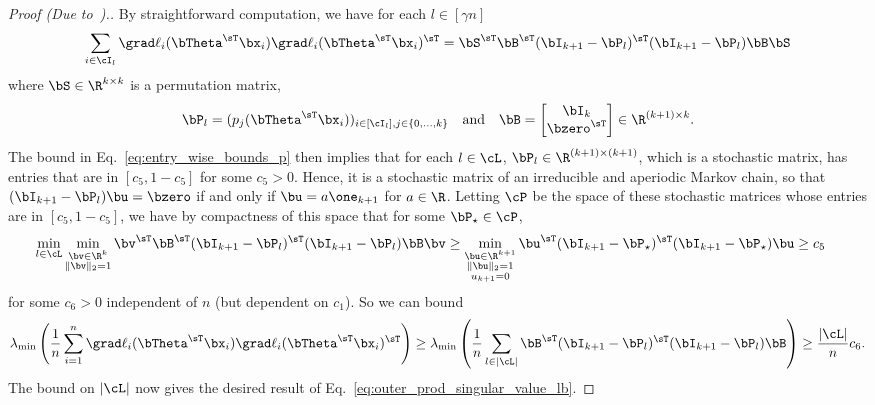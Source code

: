 \begin{proof}[Proof (Due to~\cite{tan2024multinomial}).]
By straightforward computation, we have for each $l\in[\gamma n]$
\begin{equation}
    \sum_{i \in\cI_l} \grad \ell_i(\bTheta^\sT\bx_i) \grad \ell_i(\bTheta^\sT\bx_i)^\sT = \bS^\sT\bB^\sT(\bI_{k+1} - \bP_l)^\sT(\bI_{k+1} - \bP_l)\bB \bS
\end{equation}
where $\bS \in\R^{k\times k}$ is a permutation matrix,
\begin{equation}
    \bP_l = (p_j(\bTheta^\sT\bx_i))_{i\in [\cI_l], j\in\{0,\dots,k\}} \quad\textrm{and}\quad
    \bB = \begin{bmatrix} \bI_k \\
    \bzero^\sT
    \end{bmatrix} \in\R^{(k+1) \times k}.
\end{equation}
The bound in Eq.~\eqref{eq:entry_wise_bounds_p} then implies 
that for each $l\in\cL$, $\bP_l\in\R^{(k+1)\times (k+1)}$, which is a stochastic matrix, has entries that are in $[c_5,1-c_5]$ for some $c_5>0$. Hence, it is a stochastic matrix of an irreducible and aperiodic Markov chain, so that $(\bI_{k+1} - \bP_l)\bu = \bzero$ if and only if $\bu =a\one_{k+1}$ for $a\in\R$. 
Letting $\cP$ be the space of these stochastic matrices whose entries are in $[c_5,1-c_5]$, we have by compactness of this space that 
for some $\bP_\star \in \cP$, 
\begin{align}
    \min_{l\in\cL}\min_{\substack{\bv \in\R^{k}
    \\
    \|\bv\|_2 = 1
    }}\bv^\sT\bB^\sT(\bI_{k+1} - \bP_l)^\sT(\bI_{k+1} - \bP_l)\bB\bv
    &\ge  
    \min_{\substack{\bu\in\R^{k+1}\\ \|\bu\|_2 =1\\
    u_{k+1} = 0
    }}\bu^\sT(\bI_{k+1} -\bP_\star)^\sT(\bI_{k+1} -\bP_\star )\bu \ge c_5
\end{align}
for some $c_6>0$ independent of $n$ (but dependent on $c_1$).
So we can bound
\begin{align}
    \lambda_{\min}\left( \frac1n\sum_{i=1}^n \grad \ell_i(\bTheta^\sT\bx_i)
    \grad \ell_i(\bTheta^\sT\bx_i)^\sT
    \right) 
    \ge 
    \lambda_{\min}\left(\frac1n \sum_{l\in |\cL|} 
    \bB^\sT (\bI_{k+1} - \bP_l)^\sT (\bI_{k+1} - \bP_l) \bB
    \right)
    \ge \frac{|\cL|}n  c_6.
\end{align}
The bound on $|\cL|$ now gives the desired result of Eq.~\eqref{eq:outer_prod_singular_value_lb}.
\end{proof}


